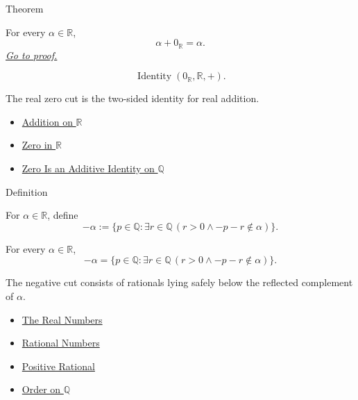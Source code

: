 \begin{theorembox}{Theorem}
\begin{theorem}
\label{thm:zero-additive-identity-on-r}
For every $\alpha\in\mathbb{R}$,
\[
\alpha+0_{\mathbb{R}}=\alpha.
\]
\hyperref[prf:zero-additive-identity-on-r]{\textit{Go to proof.}}
\end{theorem}
\end{theorembox}

\begin{remark*}
\[
\operatorname{Identity}(0_{\mathbb{R}},\mathbb{R},+).
\]
\end{remark*}

\begin{remark*}[Interpretation]
The real zero cut is the two-sided identity for real addition.
\end{remark*}

\begin{dependencies}
\begin{itemize}
  \item \hyperref[def:addition-on-r]{Addition on $\mathbb{R}$}
  \item \hyperref[def:zero-in-r]{Zero in $\mathbb{R}$}
  \item \hyperref[thm:zero-additive-identity-on-q]{Zero Is an Additive Identity on $\mathbb{Q}$}
\end{itemize}
\end{dependencies}

\begin{definitionbox}{Definition}
\begin{definition}
\label{def:negation-on-r}
For $\alpha\in\mathbb{R}$, define
\[
-\alpha:=\{p\in\mathbb{Q}:\exists r\in\mathbb{Q}\,(r>0\land -p-r\notin\alpha)\}.
\]
\end{definition}
\end{definitionbox}

\begin{remark*}
For every $\alpha\in\mathbb{R}$,
\[
-\alpha=\{p\in\mathbb{Q}:\exists r\in\mathbb{Q}\,(r>0\land -p-r\notin\alpha)\}.
\]
\end{remark*}

\begin{remark*}[Interpretation]
The negative cut consists of rationals lying safely below the reflected
complement of $\alpha$.
\end{remark*}

\begin{dependencies}
\begin{itemize}
  \item \hyperref[def:reals]{The Real Numbers}
  \item \hyperref[def:rationals]{Rational Numbers}
  \item \hyperref[def:positive-rational]{Positive Rational}
  \item \hyperref[def:order-on-q]{Order on $\mathbb{Q}$}
\end{itemize}
\end{dependencies}


